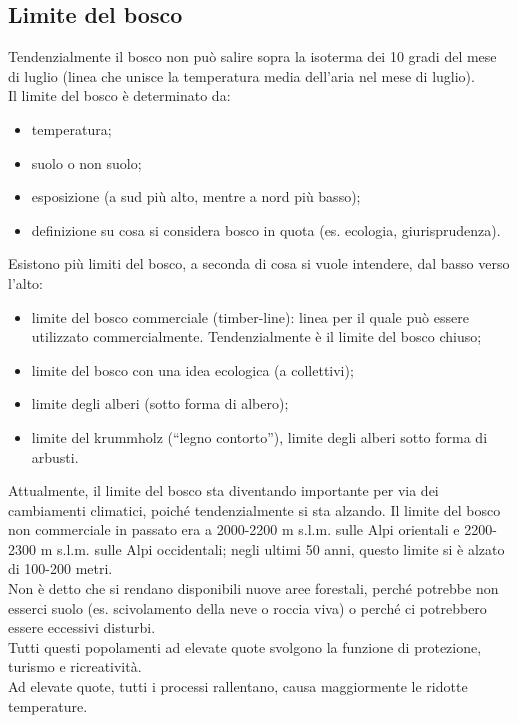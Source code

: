 \subsection{Limite del bosco}
Tendenzialmente il bosco non può salire sopra la isoterma dei 10 gradi del mese di luglio (linea che unisce la temperatura media dell'aria nel mese di luglio).\\
Il limite del bosco è determinato da:
\begin{itemize}[nosep]
    \item temperatura;
    \item suolo o non suolo;
    \item esposizione (a sud più alto, mentre a nord più basso);
    \item definizione su cosa si considera bosco in quota (es. ecologia, giurisprudenza). 
\end{itemize}
Esistono più limiti del bosco, a seconda di cosa si vuole intendere, dal basso verso l'alto:
\begin{itemize}[nosep]
    \item limite del bosco commerciale (timber-line): linea per il quale può essere utilizzato commercialmente. Tendenzialmente è il limite del bosco chiuso;
    \item limite del bosco con una idea ecologica (a collettivi);
    \item limite degli alberi (sotto forma di albero);
    \item limite del krummholz (``legno contorto''), limite degli alberi sotto forma di arbusti. 
\end{itemize}
Attualmente, il limite del bosco sta diventando importante per via dei cambiamenti climatici, poiché tendenzialmente si sta alzando. Il limite del bosco non commerciale in passato era a 2000-2200 m s.l.m. sulle Alpi orientali e 2200-2300 m s.l.m. sulle Alpi occidentali; negli ultimi 50 anni, questo limite si è alzato di 100-200 metri.\\
Non è detto che si rendano disponibili nuove aree forestali, perché potrebbe non esserci suolo (es. scivolamento della neve o roccia viva) o perché ci potrebbero essere eccessivi disturbi.\\
Tutti questi popolamenti ad elevate quote svolgono la funzione di protezione, turismo e ricreatività.\\
Ad elevate quote, tutti i processi rallentano, causa maggiormente le ridotte temperature.\\\\
